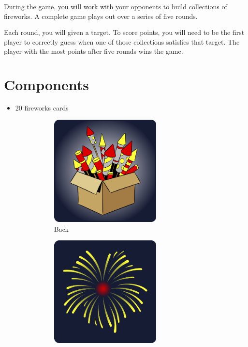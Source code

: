 \documentclass[a6paper, 12pt, parskip=half, DIV=14]{scrartcl}
\begin{document}
During the game, you will work with your opponents to build collections of fireworks. A complete game plays out over a series of five rounds.

Each round, you will given a target. To score points, you will need to be the first player to correctly guess when one of those collections satisfies that target. The player with the most points after five rounds wins the game.

\newpage
\enlargethispage{1.75\baselineskip}
\section*{Components}
    \begin{itemize}[nosep, leftmargin=*]
      \item 20 fireworks cards 
      	\vspace{-1ex}      
			\begin{figure}[H]
			\centering
				\begin{subfigure}{0.3\textwidth}
				\centering
					\includegraphics[width=0.66\textwidth]{Images/fireworks_card_back_display.png}
					\caption*{{\scriptsize Back}}
				\end{subfigure}
				\begin{subfigure}{0.3\textwidth}
				\centering
				 \includegraphics[width=0.66\textwidth]{Images/fireworks_card_front_display.png} 

\end{subfigure}
\end{figure}
\end{itemize}
\end{document}
